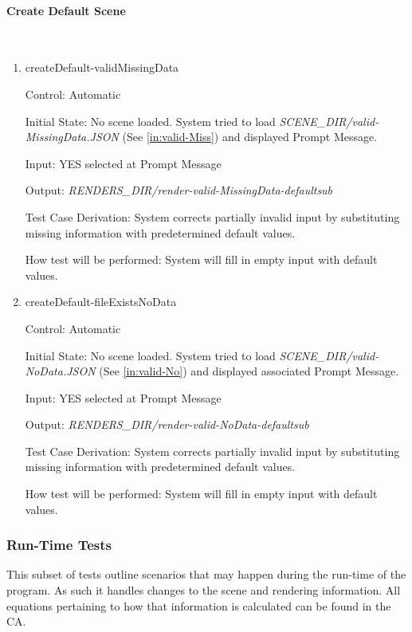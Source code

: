 \documentclass[12pt, titlepage]{article}
\begin{document}
\paragraph{Create Default Scene}
~\newline
\begin{enumerate}
	
	\item{createDefault-validMissingData\\}
	
	Control: Automatic

	Initial State: No scene loaded.	System tried to load 
	\textit{SCENE\_DIR/valid-MissingData.JSON} (See \ref{in:valid-Miss}) and 
	displayed Prompt Message.

	Input: YES selected at Prompt Message
	
	Output: \textit{RENDERS\_DIR/render-valid-MissingData-defaultsub}
	
	Test Case Derivation: System corrects partially invalid input by 
	substituting missing information with predetermined default values.
	
	How test will be performed: System will fill in empty input with default 
	values.
	
	\item{createDefault-fileExistsNoData\\}
	
	Control: Automatic
	
	Initial State: No scene loaded.	System tried to load 
	\textit{SCENE\_DIR/valid-NoData.JSON} (See \ref{in:valid-No}) and displayed 
	associated Prompt 
	Message.
	
	Input: YES selected at Prompt Message
	
	Output: \textit{RENDERS\_DIR/render-valid-NoData-defaultsub}
	
	Test Case Derivation: System corrects partially invalid input by 
	substituting missing information with predetermined default values.
	
	How test will be performed: System will fill in empty input with default 
	values.	
	
\end{enumerate}


\subsubsection{Run-Time Tests}
This subset of tests outline scenarios that may happen during the run-time of 
the program. As such it handles changes to the scene and rendering information. 
All equations pertaining to how that information is calculated can be found in 
the CA.
\end{document}
